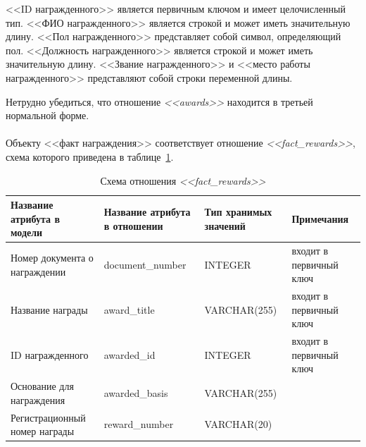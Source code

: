 <<ID награжденного>> является первичным ключом и имеет целочисленный тип.
<<ФИО награжденного>> является строкой и может иметь значительную длину.
<<Пол награжденного>> представляет собой символ, определяющий пол.
<<Должность награжденного>> является строкой и может иметь значительную длину.
<<Звание награжденного>> и <<место работы награжденного>> представляют собой строки переменной длины.

Нетрудно убедиться, что отношение \textit{<<awards>>} находится в третьей
нормальной форме.

\paragraph{}
Объекту <<факт награждения>> соответствует отношение \textit{<<fact\_rewards>>},
схема которого приведена в таблице~\ref{tbl:fact_rewards_scheme}.

\begin{table}[h!]
  \caption{Схема отношения \textit{<<fact\_rewards>>}}
  \label{tbl:fact_rewards_scheme}
  \small{
    \centering
    \begin{tabular}{| p{} | p{} | p{} | p{} |}
      \hline
      Название атрибута \newline в модели &
      Название атрибута \newline в отношении &
      Тип хранимых \newline значений &
      Примечания \\ \hline

      Номер документа \newline о награждении &
      document\_number &
      INTEGER &
      входит в первичный ключ \\
      \hline

      Название награды &
      award\_title &
      VARCHAR(255) &
      входит в первичный ключ \\
      \hline

      ID награжденного &
      awarded\_id &
      INTEGER &
      входит в первичный ключ \\
      \hline

      Основание \newline для награждения &
      awarded\_basis &
      VARCHAR(255) & \\
      \hline

      Регистрационный \newline номер награды &
      reward\_number &
      VARCHAR(20) & \\
      \hline

    \end{tabular}
  }
\end{table}

